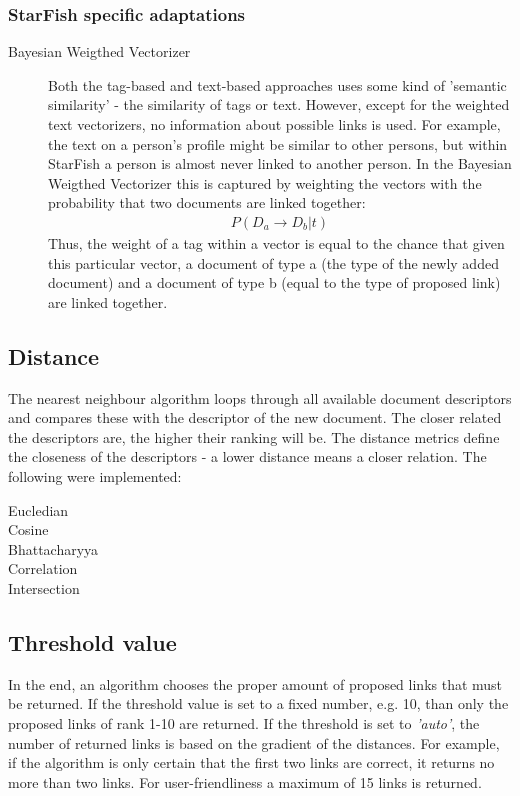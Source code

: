 \subsubsection{StarFish specific adaptations}
\begin{description}
\item[Bayesian Weigthed Vectorizer] Both the tag-based and text-based approaches uses some kind of 'semantic similarity' - the similarity of tags or text. However, except for the weighted text vectorizers, no information about possible links is used. For example, the text on a person's profile might be similar to other persons, but within StarFish a person is almost never linked to another person. In the Bayesian Weigthed Vectorizer this is captured by weighting the vectors with the probability that two documents are linked together:
\begin{align}
\nonumber P(D_a \rightarrow D_b | t)
\end{align}
Thus, the weight of a tag within a vector is equal to the chance that given this particular vector, a document of type a (the type of the newly added document) and a document of type b (equal to the type of proposed link) are linked together.
\end{description}

\subsection{Distance}
The nearest neighbour algorithm loops through all available document descriptors and compares these with the descriptor of the new document. The closer related the descriptors are, the higher their ranking will be. The distance metrics define the closeness of the descriptors - a lower distance means a closer relation. The following were implemented:

\begin{description}
\item[Eucledian]
\item[Cosine]
\item[Bhattacharyya]
\item[Correlation]
\item[Intersection]
\end{description}

\subsection{Threshold value}
In the end, an algorithm chooses the proper amount of proposed links that must be returned. If the threshold value is set to a fixed number, e.g. 10, than only the  proposed links of rank 1-10 are returned. If the threshold is set to \emph{'auto'}, the number of returned links is based on the gradient of the distances. For example, if the algorithm is only certain that the first two links are correct, it returns no more than two links. For user-friendliness a maximum of 15 links is returned. 